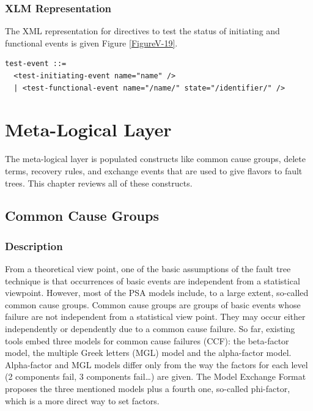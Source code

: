 \documentclass[11pt]{article}
\begin{document}
\subsubsection{XLM Representation}
\label{sec:org14ce188}

The XML representation for directives to test the status of initiating
and functional events is given Figure \ref{FigureV-19}.

\begin{lstlisting}
test-event ::=
  <test-initiating-event name="name" />
  | <test-functional-event name="/name/" state="/identifier/" />
\end{lstlisting}

\section{Meta-Logical Layer}
\label{sec:orgd50e44e}

The meta-logical layer is populated constructs like common cause groups,
delete terms, recovery rules, and exchange events that are used to give
flavors to fault trees. This chapter reviews all of these constructs.

\subsection{Common Cause Groups}
\label{sec:orge955582}


\subsubsection{Description}
\label{sec:org82b346e}

From a theoretical view point, one of the basic assumptions of the fault
tree technique is that occurrences of basic events are independent from
a statistical viewpoint. However, most of the PSA models include, to a
large extent, so-called common cause groups. Common cause groups are
groups of basic events whose failure are not independent from a
statistical view point. They may occur either independently or
dependently due to a common cause failure. So far, existing tools embed
three models for common cause failures (CCF): the beta-factor model, the
multiple Greek letters (MGL) model and the alpha-factor model.
Alpha-factor and MGL models differ only from the way the factors for
each level (2 components fail, 3 components fail\ldots{}) are given. The
Model Exchange Format proposes the three mentioned models plus a fourth
one, so-called phi-factor, which is a more direct way to set factors.
\end{document}

